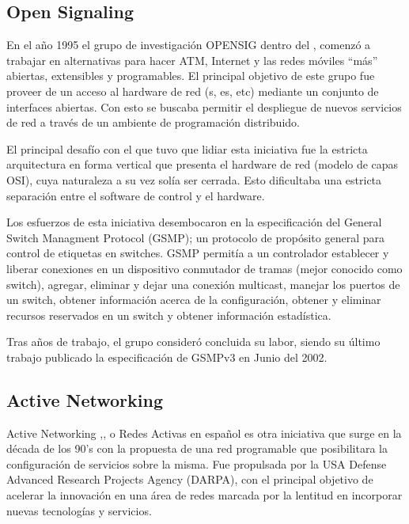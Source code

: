 \subsection{Open Signaling}
En el año 1995 el grupo de investigación OPENSIG \cite{campbell1999open} dentro del , comenzó a trabajar en alternativas para hacer ATM, Internet y las redes móviles ``más'' abiertas, extensibles y programables. El principal objetivo de este grupo fue proveer de un acceso al hardware de red (s, es, etc) mediante un conjunto de interfaces abiertas. Con esto se buscaba permitir el despliegue de nuevos servicios de red a través de un ambiente de programación distribuido.

El principal desafío con el que tuvo que lidiar esta iniciativa fue la estricta arquitectura en forma vertical que presenta el hardware de red (modelo de capas OSI), cuya naturaleza a su vez solía ser cerrada. Esto dificultaba una estricta separación entre el software de control y el hardware.

Los esfuerzos de esta iniciativa desembocaron en la especificación del General Switch Managment Protocol (GSMP); un protocolo de propósito general para control de etiquetas en switches.
GSMP permitía a un controlador establecer y liberar conexiones en un dispositivo conmutador de tramas  
 (mejor conocido como switch), agregar, eliminar y dejar una conexión multicast, manejar los puertos de un switch, obtener información acerca de la configuración, obtener y eliminar recursos reservados en un switch y obtener información estadística. 

Tras años de trabajo, el grupo consider\'o concluida su labor, siendo su último trabajo publicado la especificación de GSMPv3 en Junio del 2002\cite{doria2002general}.

\subsection{Active Networking}
Active Networking \citep{tennenhouse1997survey},\citep{tennenhouse2002towards},\citep{moore2001towards} o Redes Activas en español es otra iniciativa que surge en la década de los 90's con la propuesta de una red programable que posibilitara la configuración de servicios sobre la misma. Fue propulsada por la USA Defense Advanced Research Projects Agency (DARPA), con el principal objetivo de acelerar la innovación en una área de redes marcada por la lentitud en incorporar nuevas tecnologías y servicios.

